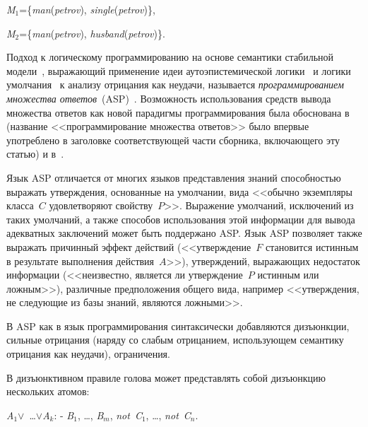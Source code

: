 \begin{multicols}{2}
\smallskip


\textit{M}$_1$\;=\;\{\textit{man}(\textit{petrov}), \textit{single}(\textit{petrov})\},

\textit{M}$_2$\;=\;\{\textit{man}(\textit{petrov}), \textit{husband}(\textit{petrov})\}.

\smallskip


\noindent
Подход к логическому программированию на осно\-ве семантики стабильной 
модели~\cite{27kal}, вы\-ра\-жа\-ющий применение идеи аутоэпистемической 
логики~\cite{29kal} и логики умолчания~\cite{20kal} к анализу\linebreak
отрицания как неудачи, 
называется \textit{программированием множества ответов}~(ASP)~\cite{28kal}. 
Возможность использования средств вывода множества ответов как 
новой парадигмы программирования\linebreak
 была обосно\-ва\-на в~\cite{30kal} (название 
<<программирование множества ответов>> было впервые употреблено в заголовке 
соответствующей части сборника, вклю\-ча\-юще\-го эту статью) и в~\cite{31kal}.

Язык ASP отличается от многих языков представления знаний способностью выражать 
утверждения, основанные на умолчании, вида <<обычно экземпляры класса~$C$ 
удовлетворяют свойству~$P$>>.\linebreak
Выражение умолчаний, исключений из таких умолчаний, а 
также способов использования этой информации для вывода адекватных заключений 
может быть поддержано ASP. Язык ASP позволяет\linebreak
также выражать причинный эффект действий 
(<<утверждение~$F$ становится истинным в результате выполнения действия~$A$>>), 
утверждений, вы\-ра\-жа\-ющих недостаток информации (<<неизвестно, является ли 
утверждение~$P$ истинным или ложным>>), различные предположения общего вида, 
например <<утверждения, не следующие из базы знаний, являются ложными>>.

В ASP как в язык программирования синтаксически добавляются дизъюнкции, сильные 
отрицания (наряду со слабым отрицанием, использующем семантику отрицания как 
неудачи), ограничения.

В дизъюнктивном правиле голова может представлять собой дизъюнкцию нескольких 
атомов:

\begin{center}
\textit{A}$_1$\;$\vee$\ \ldots $\vee$\;\textit{A}$_k$: - \textit{B}$_1$, \ldots , 
\textit{B}$_m$, \textit{not}\ \textit{C}$_1$, \ldots , 
\textit{not}\ \textit{C}$_n$.
\end{center}


\end{multicols}
